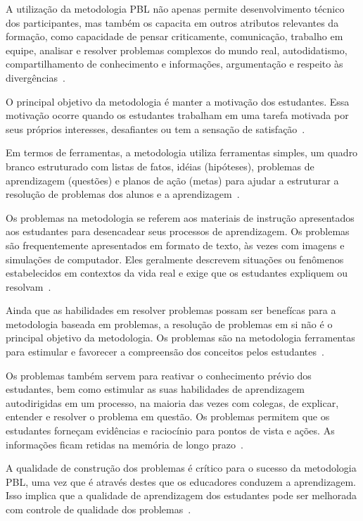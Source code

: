 A utilização da metodologia PBL não apenas permite desenvolvimento
técnico dos participantes, mas também os capacita em outros
atributos relevantes da formação, como capacidade de pensar
criticamente, comunicação, trabalho em equipe,
analisar e resolver problemas complexos do mundo real,
autodidatismo, compartilhamento de conhecimento e informações,
argumentação e respeito às
divergências~\cite{wood2003problem, savery2015overview}.

O principal objetivo da metodologia é manter a motivação
dos estudantes.
Essa motivação ocorre quando os estudantes trabalham em
uma tarefa motivada por seus próprios interesses, desafiantes
ou tem a sensação de satisfação~\cite{hmelo2004problem}.

Em termos de ferramentas, a metodologia utiliza ferramentas simples,
um quadro branco estruturado com listas de fatos,
idéias (hipóteses), problemas de aprendizagem (questões)
e planos de ação (metas) para ajudar a estruturar a
resolução de problemas dos alunos e a
aprendizagem~\cite{hmelo2004problem}. 

Os problemas na metodologia se referem aos materiais de instrução apresentados
aos estudantes para desencadear seus processos de aprendizagem.
Os problemas são frequentemente apresentados em formato de texto,
às vezes com imagens e simulações de computador.
Eles geralmente descrevem situações ou fenômenos estabelecidos
em contextos da vida real e exige que os estudantes expliquem ou
resolvam~\cite{hmelo2004problem}.

Ainda que as habilidades em resolver problemas possam ser benefícas
para a metodologia baseada em problemas, a resolução de problemas em si não é o
principal objetivo da metodologia.
Os problemas são na metodologia ferramentas para estimular e
favorecer a compreensão dos conceitos pelos
estudantes~\cite{wood2003problem, amos1998problem}.

Os problemas também servem para reativar o conhecimento prévio dos
estudantes, bem como estimular as suas habilidades de aprendizagem
autodirigidas em um processo, na maioria das vezes com colegas,
de explicar, entender e resolver o problema em
questão.
Os problemas permitem que os estudantes forneçam evidências
e raciocínio para pontos de vista e ações.
As informações ficam retidas na memória de longo
prazo~\cite{des1999delphi, azer2012twelve}.

A qualidade de construção dos problemas é crítico para o
sucesso da metodologia PBL, uma vez que é através destes
que os educadores conduzem a
aprendizagem.
Isso implica que a qualidade de aprendizagem dos estudantes
pode ser melhorada com controle de qualidade dos
problemas~\cite{santos2009analisa,des1999delphi,dolmans1997seven}.

